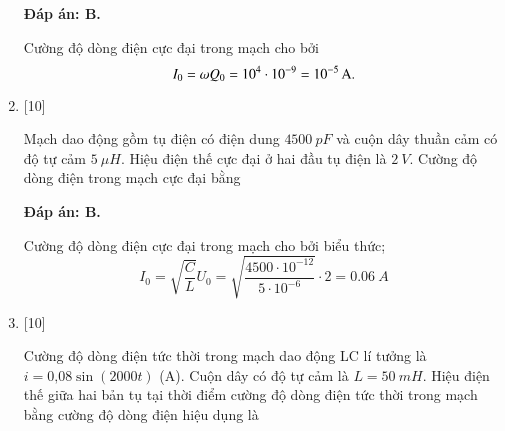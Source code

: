 \begin{enumerate}[label=\bfseries Câu \arabic*:]
	\hideall
	{		\textbf{Đáp án: B.}
		
		Cường độ dòng điện cực đại trong mạch cho bởi
		$$
		I_{0}=\omega Q_{0}=10^{4} \cdot 10^{-9}= \xsi{10^{-5}}{A}.
		$$
		
	}
	
	\item {} [10]
	
	{Mạch dao động gồm tụ điện có điện dung $\SI{4500}{pF}$ và cuộn dây thuần cảm có độ tự cảm $\SI{5}{\mu H}$. Hiệu điện thế cực đại ở hai đầu tụ điện là $\SI{2}{V}$. Cường độ dòng điện trong mạch cực đại bằng
	}
	
	\hideall
	{		\textbf{Đáp án: B.}
		
		Cường độ dòng điện cực đại trong mạch cho bởi biểu thức;
		$$
		I_{0}=\sqrt{\dfrac{C}{L}} U_{0}=\sqrt{\dfrac{4500\cdot10^{-12}}{5\cdot10^{-6}}} \cdot 2=\SI{0,06}{A}
		$$
		
	}
	
	\item {} [10]
	
	{Cường độ dòng điện tức thời trong mạch dao động LC lí tưởng là $i = \text{0,08} \sin \left( 2000t \right)$ (A). Cuộn dây có độ tự cảm là $L = \SI{50}{mH}$. Hiệu điện thế giữa hai bản tụ tại thời điểm cường độ dòng điện tức thời trong mạch bằng cường độ dòng điện hiệu dụng là
	}
	

\end{enumerate}
